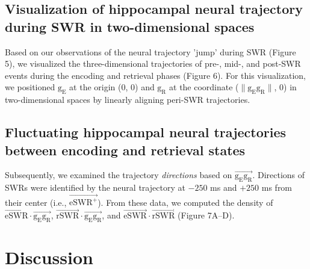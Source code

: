 \documentclass[final,3p,times,twocolumn]{elsarticle}
\begin{document}
\subsection{Visualization of hippocampal neural trajectory during SWR in two-dimensional spaces}
Based on our observations of the neural trajectory 'jump' during SWR (Figure 5), we visualized the three-dimensional trajectories of pre-, mid-, and post-SWR events during the encoding and retrieval phases (Figure 6). For this visualization, we positioned $\mathrm{g_{E}}$ at the origin (0, 0) and $\mathrm{g_{R}}$ at the coordinate ($\mathrm{\lVert g_{E}g_{R} \rVert}$, 0) in two-dimensional spaces by linearly aligning peri-SWR trajectories. 

\subsection{Fluctuating hippocampal neural trajectories between encoding and retrieval states}
Subsequently, we examined the trajectory \textit{directions} based on $\overrightarrow{\mathrm{g_{E}g_{R}}}$. Directions of SWRs were identified by the neural trajectory at $-250$ ms and $+250$ ms from their center (i.e., $\overrightarrow{\mathrm{eSWR^+}}$). From these data, we computed the density of $\overrightarrow{\mathrm{eSWR}} \cdot \overrightarrow{\mathrm{g_{E}g_{R}}}$, $\overrightarrow{\mathrm{rSWR}} \cdot \overrightarrow{\mathrm{g_{E}g_{R}}}$, and $\overrightarrow{\mathrm{eSWR}} \cdot \overrightarrow{\mathrm{rSWR}}$ (Figure 7A--D).\section{Discussion}
\end{document}
